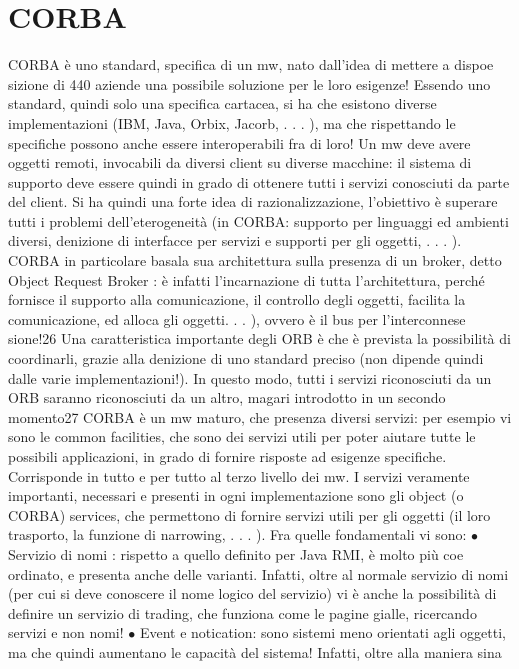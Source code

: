 \section{CORBA}
CORBA è uno standard, specifica di un mw, nato dall'idea di mettere a dispoe
sizione di 440 aziende una possibile soluzione per le loro esigenze!
Essendo uno standard, quindi solo una specifica cartacea, si ha che esistono
diverse implementazioni (IBM, Java, Orbix, Jacorb, . . . ), ma che rispettando le
specifiche possono anche essere interoperabili fra di loro!
Un mw deve avere oggetti remoti, invocabili da diversi client su diverse macchine: il sistema di supporto deve essere
quindi in grado di ottenere tutti i servizi
conosciuti da parte del client. Si ha quindi una forte idea di razionalizzazione,
l'obiettivo è superare tutti i problemi dell'eterogeneità (in CORBA: supporto
per linguaggi ed ambienti diversi, denizione di interfacce per servizi e supporti
per gli oggetti, . . . ).
CORBA in particolare basala sua architettura sulla presenza di un broker,
detto Object Request Broker : è infatti l'incarnazione di tutta l'architettura,
perché fornisce il supporto alla comunicazione, il controllo degli oggetti, facilita
la comunicazione, ed alloca gli oggetti. . . ), ovvero è il bus per l'interconnese
sione!26 Una caratteristica importante degli ORB è che è prevista la possibilità
di coordinarli, grazie alla denizione di uno standard preciso (non dipende quindi dalle varie implementazioni!). In
questo modo, tutti i servizi riconosciuti da
un ORB saranno riconosciuti da un altro, magari introdotto in un secondo
momento27
CORBA è un mw maturo, che presenza diversi servizi: per esempio vi sono
le common facilities, che sono dei servizi utili per poter aiutare tutte le possibili
applicazioni, in grado di fornire risposte ad esigenze specifiche. Corrisponde in
tutto e per tutto al terzo livello dei mw.
I servizi veramente importanti, necessari e presenti in ogni implementazione
sono gli object (o CORBA) services, che permettono di fornire servizi utili per gli
oggetti (il loro trasporto, la funzione di narrowing, . . . ). Fra quelle fondamentali
vi sono:
$\bullet$ Servizio di nomi : rispetto a quello definito per Java RMI, è molto più coe
ordinato, e presenta anche delle varianti. Infatti, oltre al normale servizio
di nomi (per cui si deve conoscere il nome logico del servizio) vi è anche la
possibilità di definire un servizio di trading, che funziona come le pagine
gialle, ricercando servizi e non nomi!
$\bullet$ Event e notication: sono sistemi meno orientati agli oggetti, ma che
quindi aumentano le capacità del sistema! Infatti, oltre alla maniera sina
